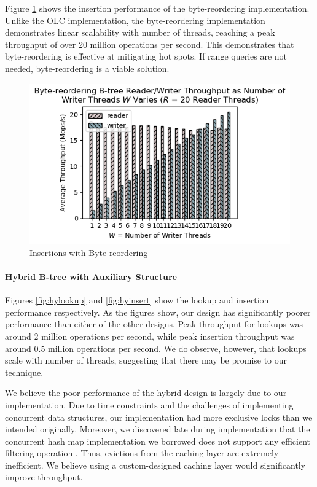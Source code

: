 \documentclass[twocolumn]{article}
\begin{document}
Figure \ref{fig:brinsert} shows the insertion performance of the
byte-reordering implementation. Unlike the OLC implementation, the
byte-reordering implementation demonstrates linear scalability with number of
threads, reaching a peak throughput of over 20 million operations per second.
This demonstrates that byte-reordering is effective at mitigating hot spots. If
range queries are not needed, byte-reordering is a viable solution.

\begin{figure}[ht]
    \centering \includegraphics[width=\columnwidth]{figures/br_r20_w1-20_avg.png}
    \caption{Insertions with Byte-reordering \label{fig:brinsert}}
\end{figure}

\paragraph{Hybrid B-tree with Auxiliary Structure}

Figures \ref{fig:hylookup} and \ref{fig:hyinsert} show the lookup and insertion
performance respectively. As the figures show, our design has significantly
poorer performance than either of the other designs. Peak throughput for
lookups was around 2 million operations per second, while peak insertion
throughput was around 0.5 million operations per second. We do observe,
however, that lookups scale with number of threads, suggesting that there may
be promise to our technique.

We believe the poor performance of the hybrid design is largely due to our
implementation. Due to time constraints and the challenges of implementing
concurrent data structures, our implementation had more exclusive locks than we
intended originally. Moreover, we discovered late during implementation that
the concurrent hash map implementation we borrowed does not support any
efficient filtering operation \cite{cuckoo}. Thus, evictions from the caching layer are
extremely inefficient. We believe using a custom-designed caching layer would
significantly improve throughput.
\end{document}
